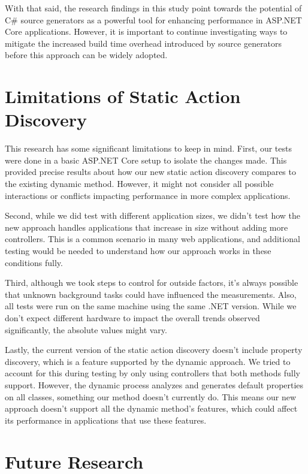 With that said, the research findings in this study point towards the potential of C\# source generators as a powerful tool for enhancing performance in ASP.NET Core applications. However, it is important to continue investigating ways to mitigate the increased build time overhead introduced by source generators before this approach can be widely adopted.


\section{Limitations of Static Action Discovery}

This research has some significant limitations to keep in mind. First, our tests were done in a basic ASP.NET Core setup to isolate the changes made. This provided precise results about how our new static action discovery compares to the existing dynamic method. However, it might not consider all possible interactions or conflicts impacting performance in more complex applications.

Second, while we did test with different application sizes, we didn't test how the new approach handles applications that increase in size without adding more controllers. This is a common scenario in many web applications, and additional testing would be needed to understand how our approach works in these conditions fully.

Third, although we took steps to control for outside factors, it's always possible that unknown background tasks could have influenced the measurements. Also, all tests were run on the same machine using the same .NET version. While we don't expect different hardware to impact the overall trends observed significantly, the absolute values might vary.

Lastly, the current version of the static action discovery doesn't include property discovery, which is a feature supported by the dynamic approach. We tried to account for this during testing by only using controllers that both methods fully support. However, the dynamic process analyzes and generates default properties on all classes, something our method doesn't currently do. This means our new approach doesn't support all the dynamic method's features, which could affect its performance in applications that use these features.

\section{Future Research}

